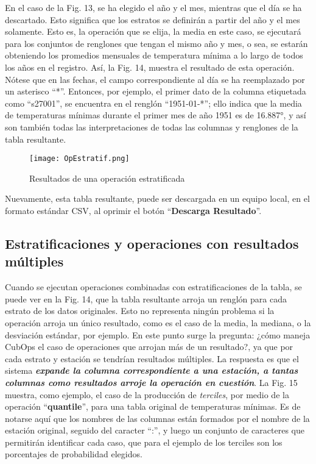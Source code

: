 \documentclass[spanish,]{article}
\begin{document}
En el caso de la Fig. 13, se ha elegido el año y el mes, mientras que el
día se ha descartado. Esto significa que los estratos se definirán a
partir del año y el mes solamente. Esto es, la operación que se elija,
la media en este caso, se ejecutará para los conjuntos de renglones que
tengan el mismo año y mes, o sea, se estarán obteniendo los promedios
mensuales de temperatura mínima a lo largo de todos los años en el
registro. Así, la Fig. 14, muestra el resultado de esta operación.
Nótese que en las fechas, el campo correspondiente al día se ha
reemplazado por un asterisco ``*''. Entonces, por ejemplo, el primer
dato de la columna etiquetada como ``s27001'', se encuentra en el
renglón ``1951-01-*''; ello indica que la media de temperaturas mínimas
durante el primer mes de año 1951 es de 16.887°, y así son también todas
las interpretaciones de todas las columnas y renglones de la tabla
resultante.

\begin{figure}
\centering
\texttt{[image: OpEstratif.png]}
\caption{Resultados de una operación estratificada}
\end{figure}

Nuevamente, esta tabla resultante, puede ser descargada en un equipo
local, en el formato estándar CSV, al oprimir el botón
``\textbf{Descarga Resultado}''.

\subsection{Estratificaciones y operaciones con resultados
múltiples}\label{estratificaciones-y-operaciones-con-resultados-multiples}

Cuando se ejecutan operaciones combinadas con estratificaciones de la
tabla, se puede ver en la Fig. 14, que la tabla resultante arroja un
renglón para cada estrato de los datos originales. Esto no representa
ningún problema si la operación arroja un único resultado, como es el
caso de la media, la mediana, o la desviación estándar, por ejemplo. En
este punto surge la pregunta: ¿cómo maneja CubOps el caso de operaciones
que arrojan más de un resultado?, ya que por cada estrato y estación se
tendrían resultados múltiples. La respuesta es que el sistema
\emph{\textbf{expande la columna correspondiente a una estación, a
tantas columnas como resultados arroje la operación en cuestión}}. La
Fig. 15 muestra, como ejemplo, el caso de la producción de
\emph{terciles}, por medio de la operación ``\textbf{quantile}'', para
una tabla original de temperaturas mínimas. Es de notarse aquí que los
nombres de las columnas están formados por el nombre de la estación
original, seguido del caracter ``:'', y luego un conjunto de caracteres
que permitirán identificar cada caso, que para el ejemplo de los
terciles son los porcentajes de probabilidad elegidos.
\end{document}
